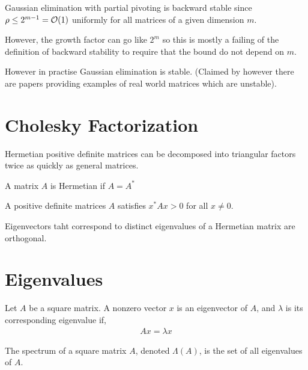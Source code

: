 \documentclass[12pt]{article}
\begin{document}
\begin{theorem}
Gaussian elimination with partial pivoting is backward stable since \( \rho \leq 2^{m-1} =  \mathcal{O}(1) \) uniformly for all matrices of a given dimension \( m \).
\end{theorem}

However, the growth factor can go like \( 2^m \) so this is mostly a failing of the definition of backward stability to require that the bound do not depend on \( m \).

However in practise Gaussian elimination is stable. (Claimed by \cite{trefethen} however there are papers providing examples of real world matrices which are unstable).

\section{Cholesky Factorization}
Hermetian positive definite matrices can be decomposed into triangular factors twice as quickly as general matrices.

\begin{definition}
A matrix \( A \) is Hermetian if \( A = A^* \)
\end{definition}

\begin{definition}
A positive definite matrices \( A \) satisfies \( x^*Ax > 0 \) for all \( x\neq 0 \).
\end{definition}

\begin{theorem}
Eigenvectors taht correspond to distinct eigenvalues of a Hermetian matrix are orthogonal.
\end{theorem}

\section{Eigenvalues}
\begin{definition}
Let \( A \) be a square matrix. A nonzero vector \( x \) is an eigenvector of \( A \), and \( \lambda \) is its corresponding eigenvalue if,
\begin{align*}
    Ax = \lambda x
\end{align*}
\end{definition}

\begin{definition}[Spectrum]
The spectrum of a square matrix \( A \), denoted \( \Lambda(A) \), is the set of all eigenvalues of \( A \).
\end{definition}
\end{document}
